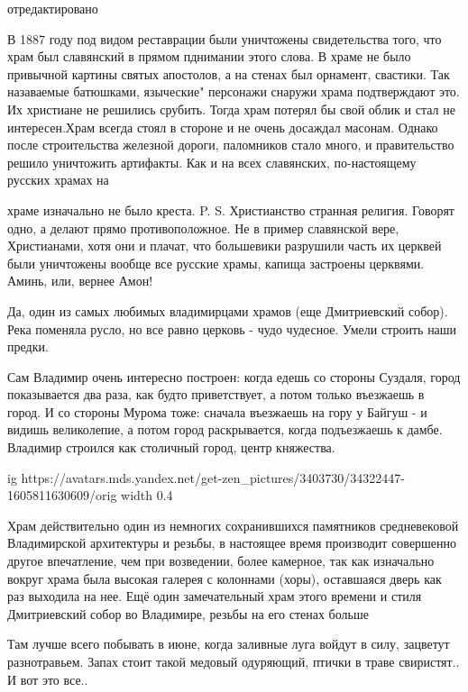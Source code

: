 \begin{itemize}
отредактировано

В 1887 году под видом реставрации были уничтожены свидетельства того, что храм был славянский в прямом пднимании этого слова. В храме не было привычной картины святых апостолов, а на стенах был орнамент, свастики. Так назаваемые батюшками, языческие" персонажи снаружи храма подтверждают это. Их христиане не решились срубить. Тогда храм потерял бы свой облик и стал не интересен.Храм всегда стоял в стороне и не очень досаждал масонам. Однако после строительства железной дороги, паломников стало много, и правительство решило уничтожить артифакты. Как и на всех славянских, по-настоящему русских храмах на

храме изначально не было креста. P. S. Христианство странная религия. Говорят
одно, а делают прямо противоположное. Не в пример славянской вере, Христианами,
хотя они и плачат, что большевики разрушили часть их церквей были уничтожены
вообще все русские храмы, капища застроены церквями. Аминь, или, вернее Амон!


Да, один из самых любимых владимирцами храмов (еще Дмитриевский собор). Река
поменяла русло, но все равно церковь - чудо чудесное. Умели строить наши
предки.

Сам Владимир очень интересно построен: когда едешь со стороны Суздаля, город
показывается два раза, как будто приветствует, а потом только въезжаешь в
город. И со стороны Мурома тоже: сначала въезжаешь на гору у Байгуш - и видишь
великолепие, а потом город раскрывается, когда подъезжаешь к дамбе. Владимир
строился как столичный город, центр княжества.


\ifcmt
  ig https://avatars.mds.yandex.net/get-zen_pictures/3403730/34322447-1605811630609/orig
  width 0.4
\fi


Храм действительно один из немногих сохранившихся памятников средневековой
Владимирской архитектуры и резьбы, в настоящее время производит совершенно
другое впечатление, чем при возведении, более камерное, так как изначально
вокруг храма была высокая галерея с колоннами (хоры), оставшаяся дверь как раз
выходила на нее. Ещё один замечательный храм этого времени и стиля Дмитриевский
собор во Владимире, резьбы на его стенах больше


Там лучше всего побывать в июне, когда заливные луга войдут в силу, зацветут
разнотравьем. Запах стоит такой медовый одуряющий, птички в траве свиристят.. И
вот это все..

\end{itemize}
